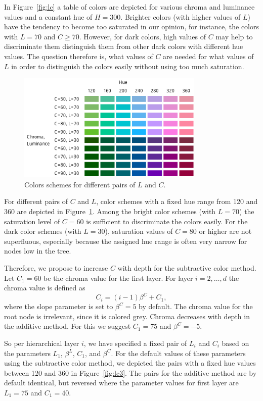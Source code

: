 \documentclass[journal]{vgtc}                %
\begin{document}
In Figure~\ref{fig:lc} a table of colors are depicted for various chroma and luminance values and a constant hue of $H=300$. Brighter colors (with higher values of $L$) have the tendency to become too saturated in our opinion, for instance, the colors with $L=70$ and $C\geq70$. However, for dark colors, high values of $C$ may help to discriminate them distinguish them from other dark colors with different hue values. The question therefore is, what values of $C$ are needed for what values of $L$ in order to distinguish the colors easily without using too much saturation.


\begin{figure}[!b]
  \centering
  \includegraphics[width=3.5in]{LC2.pdf}
  \caption{Colors schemes for different pairs of $L$ and $C$.}\label{fig:lc2}
\end{figure}

For different pairs of $C$ and $L$, color schemes with a fixed hue range from 120 and 360 are depicted in Figure~\ref{fig:lc2}. Among the bright color schemes (with $L=70$) the saturation level of $C=60$ is sufficient to discriminate the colors easily. For the dark color schemes (with $L=30$), saturation values of $C=80$ or higher are not superfluous, especially because the assigned hue range is often very narrow for nodes low in the tree.

Therefore, we propose to increase $C$ with depth for the subtractive color method. Let $C_1=60$ be the chroma value for the first layer. For layer $i=2,\ldots, d$ the chroma value is defined as
\begin{equation}
C_i=(i-1)\beta^C + C_1,
\end{equation}
where the slope parameter is set to $\beta^C=5$ by default. The chroma value for the root node is irrelevant, since it is colored grey. Chroma decreases with depth in the additive method. For this we suggest $C_1=75$ and $\beta^C=-5$.

So per hierarchical layer $i$, we have specified a fixed pair of $L_i$ and $C_i$ based on the parameters $L_1$, $\beta^L$, $C_1$, and $\beta^C$. For the default values of these parameters using the subtractive color method, we depicted the pairs with a fixed hue values between 120 and 360 in Figure~\ref{fig:lc3}. The pairs for the additive method are by default identical, but reversed where the parameter values for first layer are $L_1=75$ and $C_1=40$.
\end{document}
